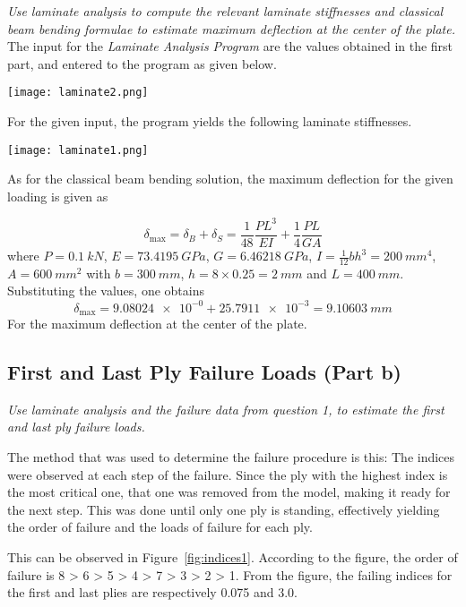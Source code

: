 \documentclass[a4paper,twosided,11pt,DIV14]{scrartcl}
\begin{document}
\textit{Use laminate analysis to compute the relevant laminate stiffnesses and classical
beam bending formulae to estimate maximum deflection at the center of the
plate.}
%
\\The input for the \emph{Laminate Analysis Program} are the values obtained in
the first part, and entered to the program as given below.
%
\begin{center}
  \texttt{[image: laminate2.png]}
\end{center}
%
For the given input, the program yields the following laminate stiffnesses.
%
\begin{center}
  \texttt{[image: laminate1.png]}
\end{center}
%
As for the classical beam bending solution, the maximum deflection for the given
loading is given as

\begin{equation}
  \delta_{\max} = \delta_B + \delta_S = \frac{1}{48}\frac{PL^3}{EI} + \frac{1}{4} \frac{PL}{GA}
\end{equation}
%
where $P=\SI{0.1}{kN}$, $E = \SI{73.4195}{GPa}$, $G=\SI{6.46218}{GPa}$,
$I = \frac{1}{12} b h^3 = \SI{200}{mm^4}$, $A=\SI{600}{mm^2}$ with $b =
\SI{300}{mm}$, $h = 8 \times 0.25 = \SI{2}{mm}$ and $L=\SI{400}{mm}$.
%
\\Substituting the values, one obtains
%
\begin{equation}
  \delta_{\max} = \num{9.08024e-0} + \num{25.7911e-3} = \SI{9.10603}{mm}
\end{equation}
%
For the maximum deflection at the center of the plate.

\subsection{First and Last Ply Failure Loads (Part b)}

\textit{Use laminate analysis and the failure data from question 1, to estimate the
first and last ply failure loads.}

The method that was used to determine the failure procedure is this: The indices
were observed at each step of the failure. Since the ply with the highest
index is the most critical one, that one was removed from the model, making it
ready for the next step. This was done until only one ply is standing,
effectively yielding the order of failure and the loads of failure for each
ply.

This can be observed in Figure~\ref{fig:indices1}. According to the figure, the
order of failure is 8 > 6 > 5 > 4 > 7 > 3 > 2 > 1. From the figure, the failing
indices for the first and last plies are respectively 0.075 and 3.0.
\end{document}

